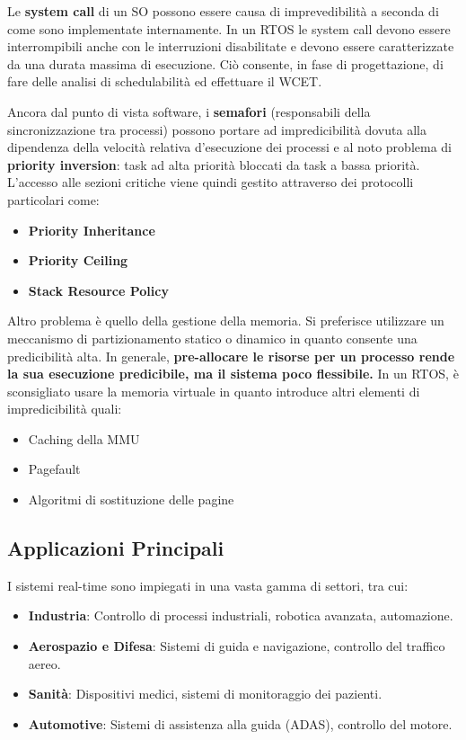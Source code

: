 \documentclass[11pt,a4paper]{report}
\begin{document}
Le \textbf{system call} di un SO possono essere causa di imprevedibilità a seconda di come sono implementate internamente. In un RTOS le system call devono essere interrompibili anche con le interruzioni disabilitate e devono essere caratterizzate da una durata massima di esecuzione. Ciò consente, in fase di progettazione, di fare delle analisi di schedulabilità ed effettuare il WCET.

Ancora dal punto di vista software, i \textbf{semafori} (responsabili della sincronizzazione tra processi) possono portare ad impredicibilità dovuta alla dipendenza della velocità relativa d'esecuzione dei processi e al noto problema di \textbf{priority inversion}: task ad alta priorità bloccati da task a bassa priorità. L'accesso alle sezioni critiche viene quindi gestito attraverso dei protocolli particolari come:
\begin{itemize}
    \item \textbf{Priority Inheritance}
    \item \textbf{Priority Ceiling}
    \item \textbf{Stack Resource Policy}
\end{itemize}

Altro problema è quello della gestione della memoria. Si preferisce utilizzare un meccanismo di partizionamento statico o dinamico in quanto consente una predicibilità alta. In generale, \textbf{pre-allocare le risorse per un processo rende la sua esecuzione predicibile, ma il sistema poco flessibile.} In un RTOS, è sconsigliato usare la memoria virtuale in quanto introduce altri elementi di impredicibilità quali:
\begin{itemize}
    \item Caching della MMU
    \item Pagefault
    \item Algoritmi di sostituzione delle pagine
\end{itemize}

\subsection{Applicazioni Principali}

I sistemi real-time sono impiegati in una vasta gamma di settori, tra cui:
\begin{itemize}
    \item \textbf{Industria}: Controllo di processi industriali, robotica avanzata, automazione.
    \item \textbf{Aerospazio e Difesa}: Sistemi di guida e navigazione, controllo del traffico aereo.
    \item \textbf{Sanità}: Dispositivi medici, sistemi di monitoraggio dei pazienti.
    \item \textbf{Automotive}: Sistemi di assistenza alla guida (ADAS), controllo del motore.
\end{itemize}
\end{document}
